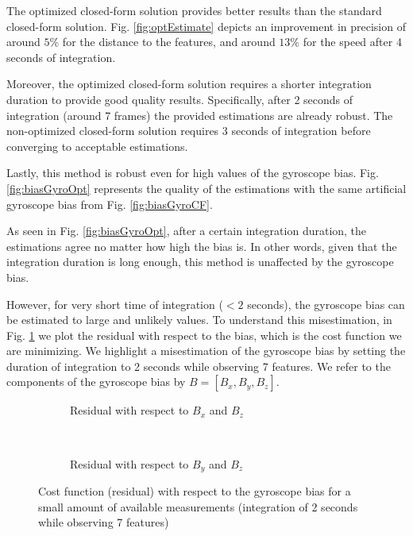 \documentclass[letterpaper, 10 pt, conference]{ieeeconf}  %
\begin{document}

The optimized closed-form solution provides better results than the standard closed-form solution. Fig. \ref{fig:optEstimate} depicts an improvement in precision of around $5\%$ for the distance to the features, and around $13\%$ for the speed after 4 seconds of integration.

Moreover, the optimized closed-form solution requires a shorter integration duration to provide good quality results.
Specifically, after 2 seconds of integration (around 7 frames) the provided estimations are already robust.
The non-optimized closed-form solution requires 3 seconds of integration before converging to acceptable estimations.


Lastly, this method is robust even for high values of the gyroscope bias.
Fig. \ref{fig:biasGyroOpt} represents the quality of the estimations with the same artificial gyroscope bias from Fig. \ref{fig:biasGyroCF}.



As seen in Fig. \ref{fig:biasGyroOpt}, after a certain integration duration, the estimations agree no matter how high the bias is.
In other words, given that the integration duration is long enough, this method is unaffected by the gyroscope bias.

However, for very short time of integration ($<2$ seconds), the gyroscope bias can be estimated to large and unlikely values.
To understand this misestimation, in Fig. \ref{fig:cost} we plot the residual with respect to the bias, which is the cost function we are minimizing.
We highlight a misestimation of the gyroscope bias by setting the duration of integration to 2 seconds while observing 7 features.
We refer to the components of the gyroscope bias by $B = [B_x, B_y, B_z]$.

\begin{figure}
        \centering
        \begin{subfigure}[b]{0.47\columnwidth}
                \resizebox{\columnwidth}{!}{}
                \caption{Residual with respect to $B_x$ and $B_z$}
        \end{subfigure}~
        \begin{subfigure}[b]{0.47\columnwidth}
                \resizebox{\columnwidth}{!}{}
                \caption{Residual with respect to $B_y$ and $B_z$}
        \end{subfigure}
        \caption{Cost function (residual) with respect to the gyroscope bias for a small amount of available measurements (integration of 2 seconds while observing 7 features)\label{fig:cost}}
\end{figure}
\end{document}
